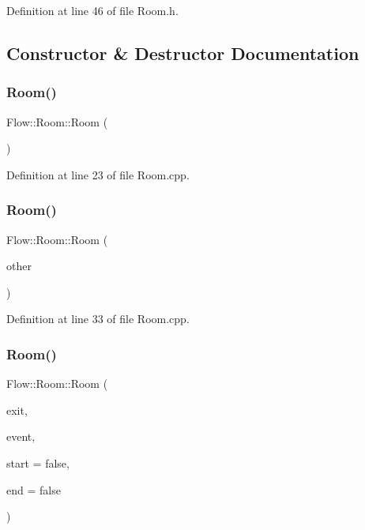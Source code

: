 Definition at line 46 of file Room.\+h.



\subsection{Constructor \& Destructor Documentation}
\hypertarget{class_flow_1_1_room_acbd4ea4683660ee3f5120b396e3d9e67}{}\label{class_flow_1_1_room_acbd4ea4683660ee3f5120b396e3d9e67} 
\subsubsection{\texorpdfstring{Room()}{Room()}\hspace{0.1cm}{\footnotesize\ttfamily [1/3]}}
{\footnotesize\ttfamily Flow\+::\+Room\+::\+Room (\begin{DoxyParamCaption}{ }\end{DoxyParamCaption})}



Definition at line 23 of file Room.\+cpp.

\hypertarget{class_flow_1_1_room_ab9bb4be79ce8b04be3537a6fc308dad4}{}\label{class_flow_1_1_room_ab9bb4be79ce8b04be3537a6fc308dad4} 
\subsubsection{\texorpdfstring{Room()}{Room()}\hspace{0.1cm}{\footnotesize\ttfamily [2/3]}}
{\footnotesize\ttfamily Flow\+::\+Room\+::\+Room (\begin{DoxyParamCaption}\item[{const \hyperlink{class_flow_1_1_room}{Room} \&}]{other }\end{DoxyParamCaption})}



Definition at line 33 of file Room.\+cpp.

\hypertarget{class_flow_1_1_room_ab72d88a0660f8d836fc8edc18ded95dc}{}\label{class_flow_1_1_room_ab72d88a0660f8d836fc8edc18ded95dc} 
\subsubsection{\texorpdfstring{Room()}{Room()}\hspace{0.1cm}{\footnotesize\ttfamily [3/3]}}
{\footnotesize\ttfamily Flow\+::\+Room\+::\+Room (\begin{DoxyParamCaption}\item[{unsigned char}]{exit,  }\item[{\hyperlink{namespace_flow_a01e62c2d0a9c24924a2fce4b667dd9d8}{Rm\+Event}}]{event,  }\item[{bool}]{start = {\ttfamily false},  }\item[{bool}]{end = {\ttfamily false} }\end{DoxyParamCaption})}



